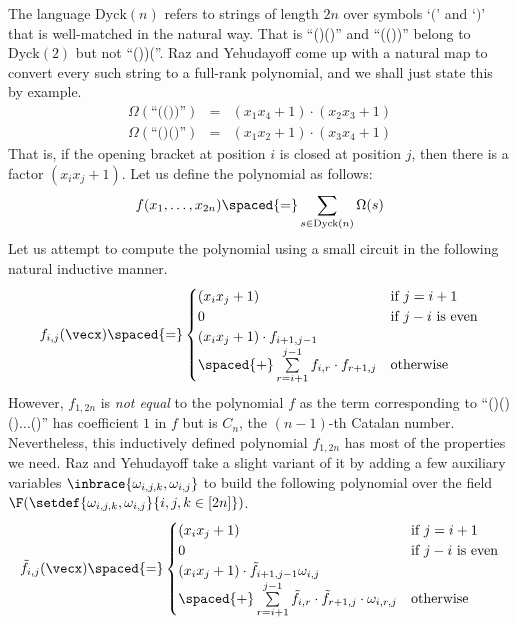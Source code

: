 The language $\mathrm{Dyck}(n)$ refers to strings of length $2n$ over symbols `$($' and `$)$' that is well-matched in the natural way. 
That is ``()()'' and ``(())'' belong to $\mathrm{Dyck}(2)$ but not ``())(''. 
Raz and Yehudayoff come up with a natural map to convert every such string to a full-rank polynomial, and we shall just state this by example. 
\begin{eqnarray*}
\Omega(\text{``(())''}) & = & (x_1x_4 + 1)\cdot (x_2x_3 + 1)\\
\Omega(\text{``()()''}) & = & (x_1x_2 + 1)\cdot (x_3x_4 + 1)
\end{eqnarray*}
That is, if the opening bracket at position $i$ is closed at position $j$, then there is a factor $(x_ix_j + 1)$. 
Let us define the polynomial as follows:
\[
f(x_1,\dots, x_{2n}) \spaced{=} \sum_{s\in \mathrm{Dyck}(n)} \Omega(s) 
\]
Let us attempt to compute the polynomial using a small circuit in the following natural inductive manner. 
\[
f_{i,j}(\vecx) \spaced{=} \begin{cases}
(x_ix_j+1) & \text{if $j = i+1$}\\
0 & \text{if $j-i$ is even}\\
(x_ix_j+1) \cdot f_{i+1,j-1} &\\
 \spaced{+} \sum\limits_{r=i+1}^{j-1} f_{i,r}\cdot f_{r+1,j} & \text{otherwise}
\end{cases}
\]
However, $f_{1,2n}$ is \emph{not equal} to the polynomial $f$ as the term corresponding to ``()()()$\dots$()'' has coefficient $1$ in $f$ but is $C_n$, the $(n-1)$-th Catalan number. 
Nevertheless, this inductively defined polynomial $f_{1,2n}$ has most of the properties we need. 
Raz and Yehudayoff take a slight variant of it by adding a few auxiliary variables $\inbrace{\omega_{i,j,k},\omega_{i,j}}$ to build the following polynomial over the field $\F(\setdef{\omega_{i,j,k},\omega_{i,j}}{i,j,k\in [2n]})$. 
\[
\tilde{f}_{i,j}(\vecx) \spaced{=} \begin{cases}
(x_ix_j+1) & \text{if $j = i+1$}\\
0 & \text{if $j-i$ is even}\\
(x_ix_j+1) \cdot \tilde{f}_{i+1,j-1} \omega_{i,j}&\\
 \spaced{+} \sum\limits_{r=i+1}^{j-1} \tilde{f}_{i,r}\cdot \tilde{f}_{r+1,j} \cdot \omega_{i,r,j} & \text{otherwise}
\end{cases}
\]

